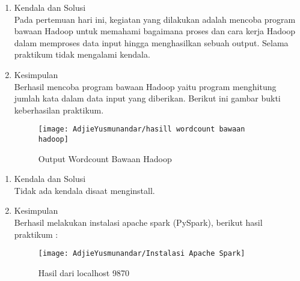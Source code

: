 \begin{enumerate}
\item Kendala dan Solusi \\
Pada pertemuan hari ini, kegiatan yang dilakukan adalah mencoba program bawaan Hadoop untuk memahami bagaimana proses dan cara kerja Hadoop dalam memproses data input hingga menghasilkan sebuah output. Selama praktikum tidak mengalami kendala.

\item Kesimpulan \\
Berhasil mencoba program bawaan Hadoop yaitu program menghitung jumlah kata dalam data input yang diberikan. Berikut ini gambar bukti keberhasilan praktikum. 

\begin{figure}
\texttt{[image: AdjieYusmunandar/hasill wordcount bawaan hadoop]}
\caption{Output Wordcount Bawaan Hadoop}
\end{figure}

\end{enumerate}

\begin{enumerate}
\item Kendala dan Solusi \\
Tidak ada kendala disaat menginstall.

\item Kesimpulan\\
Berhasil melakukan instalasi apache spark (PySpark), berikut hasil praktikum :

\begin{figure}
\texttt{[image: AdjieYusmunandar/Instalasi Apache Spark]}
\caption{Hasil dari localhost 9870}
\end{figure}
\end{enumerate}